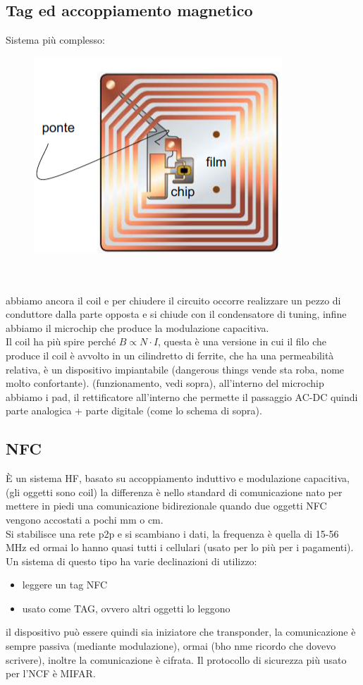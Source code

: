 \documentclass[oneside, 12pt]{extbook}
\begin{document}
\subsection{Tag ed accoppiamento magnetico}
Sistema più complesso:\\
\begin{figure}[!h]
	\includegraphics[scale=0.3]{immagini/tag-magn.png}
\end{figure}
\\\\abbiamo ancora il coil e per chiudere il circuito occorre realizzare un pezzo di conduttore dalla parte opposta e si chiude con il condensatore di tuning, infine abbiamo il microchip che produce la modulazione capacitiva.\\Il coil ha più spire perché $B \propto N \cdot I$, questa è una versione in cui il filo che produce il coil è avvolto in un cilindretto di ferrite, che ha una permeabilità relativa, è un dispositivo impiantabile (dangerous things vende sta roba, nome molto confortante). (funzionamento, vedi sopra), all'interno del microchip abbiamo i pad, il rettificatore all'interno che permette il passaggio AC-DC quindi parte analogica + parte digitale (come lo schema di sopra).

\subsection{NFC}
È un sistema HF, basato su accoppiamento induttivo e modulazione capacitiva, (gli oggetti sono coil) la differenza è nello standard di comunicazione nato per mettere in piedi una comunicazione bidirezionale quando due oggetti NFC vengono accostati a pochi mm o cm.\\Si stabilisce una rete p2p e si scambiano i dati, la frequenza è quella di 15-56 MHz ed ormai lo hanno quasi tutti i cellulari (usato per lo più per i pagamenti).\\Un sistema di questo tipo ha varie declinazioni di utilizzo:
\begin{itemize}
	\item leggere un tag NFC
	\item usato come TAG, ovvero altri oggetti lo leggono
\end{itemize} 
il dispositivo può essere quindi sia iniziatore che transponder, la comunicazione è sempre passiva (mediante modulazione), ormai (bho nme ricordo che dovevo scrivere), inoltre la comunicazione è cifrata.
Il protocollo di sicurezza più usato per l'NCF è MIFAR.
\end{document}
